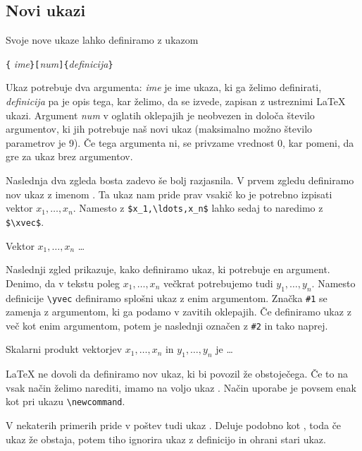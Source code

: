 \subsection{Novi ukazi}

Svoje nove ukaze lahko definiramo z ukazom 
\begin{lscommand}
\verb|{|%
       \emph{ime}\verb|}[|\emph{num}\verb|]{|\emph{definicija}\verb|}|
\end{lscommand}
\noindent Ukaz potrebuje dva argumenta: \emph{ime} je ime ukaza, ki ga 
želimo definirati, \emph{definicija} pa je opis tega, kar želimo, da se izvede, zapisan 
z ustreznimi \LaTeX{} ukazi. Argument \emph{num} v oglatih oklepajih je neobvezen in 
določa število argumentov, ki jih potrebuje naš novi ukaz (maksimalno možno število parametrov je 9).
Če tega argumenta ni, se privzame vrednost $0$, kar pomeni, da gre za ukaz brez 
argumentov.

Naslednja dva zgleda bosta zadevo še bolj razjasnila. V prvem zgledu
definiramo nov ukaz z imenom . Ta ukaz nam pride prav vsakič ko je potrebno 
izpisati vektor $x_1,\ldots,x_n$. Namesto z \verb|$x_1,\ldots,x_n$| lahko sedaj
to naredimo z \verb|$\xvec$|.

\begin{example}
\newcommand{\xvec}{x_1,\ldots,x_n}
Vektor $\xvec$ \ldots
\end{example}

Naslednji zgled prikazuje, kako definiramo ukaz, ki potrebuje en argument. 
Denimo, da v tekstu poleg $x_1,\ldots,x_n$ večkrat potrebujemo tudi 
$y_1,\ldots,y_n$. Namesto definicije \verb|\yvec| definiramo splošni ukaz 
z enim argumentom. Značka \verb|#1| se zamenja z argumentom, ki ga podamo v zavitih oklepajih.
Če definiramo ukaz z več kot enim argumentom, potem je naslednji označen z \verb|#2| in tako
naprej.

\begin{example}
\newcommand{\lvec}[1]
 {#1_1,\ldots,#1_n}
Skalarni produkt vektorjev
$\lvec{x}$ in $\lvec{y}$ je 
\ldots
\end{example}

\LaTeX{} ne dovoli da definiramo nov ukaz, ki bi povozil že obstoječega. Če to na vsak način želimo
narediti, imamo na voljo ukaz .
Način uporabe je povsem enak kot pri ukazu \verb|\newcommand|.

V nekaterih primerih pride v poštev tudi ukaz .
Deluje podobno kot , toda če ukaz že obstaja, potem \LaTeXe{} tiho ignorira ukaz z definicijo 
in ohrani stari ukaz.

